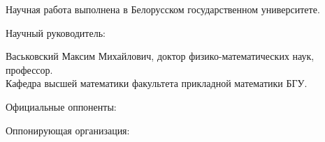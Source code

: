 \documentclass[_00_autoref.tex]{subfiles}
\begin{document}
\pagestyle{empty}
\setlength{\voffset}{-18mm}
\noindent Научная работа выполнена в Белорусском государственном университете.

\noindent
\begin{minipage}[t]{0.38\textwidth}
  \begin{flushleft}
    Научный руководитель:
  \end{flushleft}
\end{minipage}
\begin{minipage}[t]{0.61\textwidth}
  \begin{flushleft}
    Васьковский Максим Михайлович, доктор физико-математических наук, профессор.\\
    Кафедра высшей математики факультета прикладной математики БГУ.
  \end{flushleft}
\end{minipage}

\medskip
\noindent
\begin{minipage}[t]{0.38\textwidth}
    \begin{flushleft}
        Официальные оппоненты:
    \end{flushleft}
\end{minipage}
\begin{minipage}[t]{0.61\textwidth}
    \begin{flushleft}

\medskip
  \end{flushleft}
\end{minipage}

\medskip
\noindent
\begin{minipage}[t]{0.38\textwidth}
    \begin{flushleft}
        Оппонирующая организация:
    \end{flushleft}
\end{minipage}
\begin{minipage}[t]{0.61\textwidth}
    \begin{flushleft}
    \medskip
  \end{flushleft}
\end{minipage}
\end{document}

